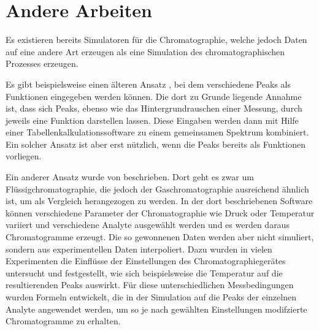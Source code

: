 \section{Andere Arbeiten}

Es existieren bereits Simulatoren für die Chromatographie, welche jedoch Daten auf eine andere Art erzeugen als eine Simulation des chromatographischen Prozesses erzeugen.

Es gibt beispielsweise einen älteren Ansatz \citep{spreadsheet}, bei dem verschiedene Peaks als Funktionen eingegeben werden können. Die dort zu Grunde liegende Annahme ist, dass sich Peaks, ebenso wie das Hintergrundrauschen einer Messung, durch jeweils eine Funktion darstellen lassen. Diese Eingaben werden dann mit Hilfe einer Tabellenkalkulationssoftware zu einem gemeinsamen Spektrum kombiniert. Ein solcher Ansatz ist aber erst nützlich, wenn die Peaks bereits als Funktionen vorliegen.

Ein anderer Ansatz wurde von \citet{hplcsim} beschrieben. Dort geht es zwar um Flüssigchromatographie, die jedoch der Gaschromatographie ausreichend ähnlich ist, um als Vergleich herangezogen zu werden. In der dort beschriebenen Software können verschiedene Parameter der Chromatographie wie Druck oder Temperatur variiert und verschiedene Analyte ausgewählt werden und es werden daraus Chromatogramme erzeugt. Die so gewonnenen Daten werden aber nicht simuliert, sondern aus experimentellen Daten interpoliert. Dazu wurden in vielen Experimenten die Einflüsse der Einstellungen des Chromatographiegerätes untersucht und festgestellt, wie sich beispielsweise die Temperatur auf die resultierenden Peaks auswirkt. Für diese unterschiedlichen Messbedingungen wurden Formeln entwickelt, die in der Simulation auf die Peaks der einzelnen Analyte angewendet werden, um so je nach gewählten Einstellungen modifzierte Chromatogramme zu erhalten.

 